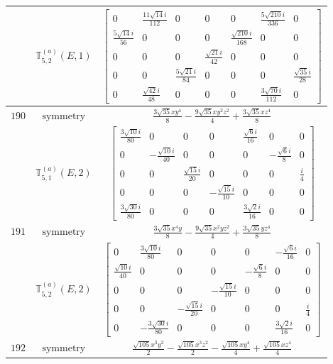 \documentclass[fleqn,8pt,landscape]{jsarticle}
\begin{document}
\begin{longtable}{ccc}
$  $ & $ \mathbb{T}_{5,2}^{(a)}(E,1) $ & $ \begin{bmatrix} 0 & \frac{11 \sqrt{14} i}{112} & 0 & 0 & 0 & \frac{5 \sqrt{210} i}{336} & 0 \\ \frac{5 \sqrt{14} i}{56} & 0 & 0 & 0 & \frac{\sqrt{210} i}{168} & 0 & 0 \\ 0 & 0 & 0 & \frac{\sqrt{21} i}{42} & 0 & 0 & 0 \\ 0 & 0 & \frac{5 \sqrt{21} i}{84} & 0 & 0 & 0 & \frac{\sqrt{35} i}{28} \\ 0 & \frac{\sqrt{42} i}{48} & 0 & 0 & 0 & \frac{3 \sqrt{70} i}{112} & 0 \end{bmatrix} $ \\ \hline
$ 190 $ & $ \text{symmetry} $ & $ \frac{3 \sqrt{35} x y^{4}}{8} - \frac{9 \sqrt{35} x y^{2} z^{2}}{4} + \frac{3 \sqrt{35} x z^{4}}{8} $ \\
$  $ & $ \mathbb{T}_{5,1}^{(a)}(E,2) $ & $ \begin{bmatrix} \frac{3 \sqrt{10} i}{80} & 0 & 0 & 0 & \frac{\sqrt{6} i}{16} & 0 & 0 \\ 0 & - \frac{\sqrt{10} i}{40} & 0 & 0 & 0 & - \frac{\sqrt{6} i}{8} & 0 \\ 0 & 0 & \frac{\sqrt{15} i}{20} & 0 & 0 & 0 & \frac{i}{4} \\ 0 & 0 & 0 & - \frac{\sqrt{15} i}{10} & 0 & 0 & 0 \\ \frac{3 \sqrt{30} i}{80} & 0 & 0 & 0 & \frac{3 \sqrt{2} i}{16} & 0 & 0 \end{bmatrix} $ \\ \hline
$ 191 $ & $ \text{symmetry} $ & $ \frac{3 \sqrt{35} x^{4} y}{8} - \frac{9 \sqrt{35} x^{2} y z^{2}}{4} + \frac{3 \sqrt{35} y z^{4}}{8} $ \\
$  $ & $ \mathbb{T}_{5,2}^{(a)}(E,2) $ & $ \begin{bmatrix} 0 & \frac{3 \sqrt{10} i}{80} & 0 & 0 & 0 & - \frac{\sqrt{6} i}{16} & 0 \\ \frac{\sqrt{10} i}{40} & 0 & 0 & 0 & - \frac{\sqrt{6} i}{8} & 0 & 0 \\ 0 & 0 & 0 & - \frac{\sqrt{15} i}{10} & 0 & 0 & 0 \\ 0 & 0 & - \frac{\sqrt{15} i}{20} & 0 & 0 & 0 & \frac{i}{4} \\ 0 & - \frac{3 \sqrt{30} i}{80} & 0 & 0 & 0 & \frac{3 \sqrt{2} i}{16} & 0 \end{bmatrix} $ \\ \hline
$ 192 $ & $ \text{symmetry} $ & $ \frac{\sqrt{105} x^{3} y^{2}}{2} - \frac{\sqrt{105} x^{3} z^{2}}{2} - \frac{\sqrt{105} x y^{4}}{4} + \frac{\sqrt{105} x z^{4}}{4} $ \\

\end{longtable}
\end{document}
